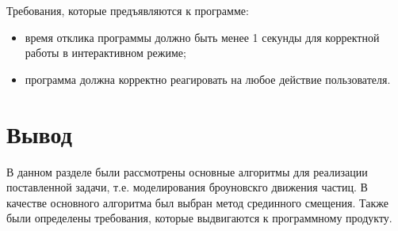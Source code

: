 Требования, которые предъявляются к программе:

\begin{itemize}
    \item время отклика программы должно быть менее 1 секунды для корректной работы в интерактивном режиме;
    \item программа должна корректно реагировать на любое действие пользователя.
\end{itemize}


\section*{Вывод}

В данном разделе были рассмотрены основные алгоритмы для реализации поставленной задачи, т.е. моделирования броуновскго движения частиц. В качестве основного алгоритма был выбран метод срединного смещения. Также были определены требования, которые выдвигаются к программному продукту. 

